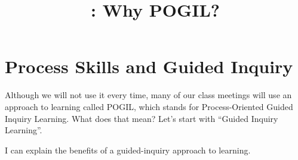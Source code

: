 \documentclass{tufte-handout}
\title{\thecourse: Why POGIL?}
\date{}
\begin{document}
\maketitle

\section{Process Skills and Guided Inquiry}

Although we will not use it every time, many of our class meetings
will use an approach to learning called POGIL, which stands for
Process-Oriented Guided Inquiry Learning.  What does that mean?  Let's
start with ``Guided Inquiry Learning''.

\begin{objective}
  I can explain the benefits of a guided-inquiry approach to
  learning.
\end{objective}
\end{document}
